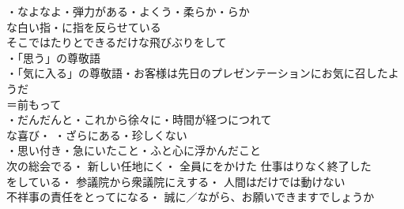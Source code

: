 ・なよなよ・弾力がある・よくう・柔らか・らか\\
な白い指・に指を反らせている\\
そこではたりとできるだけな飛びぶりをして\\

・「思う」の尊敬語\\
・「気に入る」の尊敬語・お客様は先日のプレゼンテーションにお気に召したようだ\\

＝前もって\\
・だんだんと・これから徐々に・時間が経つにつれて\\

な喜び・
・ざらにある・珍しくない\\
・思い付き・急にいたこと・ふと心に浮かんだこと\\

次の総会でる・
新しい任地にく・
全員にをかけた
仕事はりなく終了した\\
をしている・
参議院から衆議院にえする・
人間はだけでは動けない\\
不祥事の責任をとってになる・
誠に／ながら、お願いできますでしょうか\\


